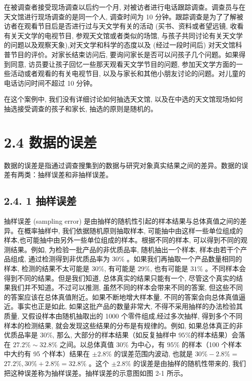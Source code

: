 \documentclass[10pt]{article}
\begin{document}
\begin{CJK*}{UTF8}{bsmi}
在被调查者接受现场调查以后约一个月, 对被访者进行电话跟踪调查。调查员与在天文馆进行现场调查的是同一个人, 调查时间为 10 分钟。跟踪调查是为了了解被访者在观看节目后是否进行过与天文学有关的活动 (买书、资料或者望远镜, 收看有关天文学的电视节目, 参观天文馆或者类似的场馆, 与孩子共同讨论有关天文学的问题以及观察天象),对天文学和科学的态度以及 (经过一段时间后) 对天文馆科普节目的评价。对家长结束访问后, 要询问家长是否可以问孩子几个问题。如果得到同意, 访员要让孩子回忆一些那天观看天文学节目的问题, 参加天文学方面的一些活动或者观看的有关电视节目, 以及与家长和其他小朋友讨论的问题。对儿童的电话访问时间不超过 10 分钟。

在这个案例中, 我们没有详细讨论如何抽选天文馆, 以及在中选的天文馆现场如何抽选接受调查的孩子和家长, 抽选的原则是随机的。

\section*{2.4 数据的误差}
数据的误差是指通过调查搜集到的数据与研究对象真实结果之间的差异。数据的误差有两类：抽样误差和非抽样误差。

\subsection*{2.4. 1 抽样误差}
抽样误差 (sampling error) 是由抽样的随机性引起的样本结果与总体真值之间的差异。在概率抽样中, 我们依据随机原则抽取样本, 可能抽中由这样一些单位组成的样本,也可能抽中由另外一些单位组成的样本。根据不同的样本, 可以得到不同的观测结果。例如, 为检验一批产品的非优质品率, 随机抽出一个样本, 样本由若干个产品组成, 通过检测得到非优质品率为 $30 \%$ 。如果我们再抽取一个产品数量相同的样本, 检测的结果不太可能是 $30 \%$, 有可能是 $29 \%$, 也有可能是 $31 \%$ 。不同样本会得到不同的结果。但是我们知道, 总体真实的结果只能有一个, 尽管这个真实的结果我们并不知道。不过可以推测, 虽然不同的样本会带来不同的答案, 但这些不同的答案应该在总体真值附近。如果不断地增大样本量, 不同的答案会向总体真值逼近。事实也正是如此, 如果这批产品的数量非常大, 不得不采用抽样的办法检验其质量, 又假设样本由随机抽取出的 1000 个零件组成,经过多次抽样, 得到多个不同样本的检测结果, 就会发现这些结果的分布是有规律的。例如, 如果总体真正的非优质品率是 $30 \%$, 那么, 大部分的样本结果（如反复抽样中 $95 \%$的样本结果）会落在 $27.2 \% \sim 32.8 \%$ 之间。以总体真值 $30 \%$ 为中心，有 $95 \%$ 的样本（100 个样本中大约有 95 个样本）结果在 $\pm 2.8 \%$ 的误差范围内波动, 也就是 $30 \%-2.8 \%=$ $27.2 \%, 30 \%+2.8 \%=32.8 \%$ 。这个 $\pm 2.8 \%$ 的误差是由抽样的随机性带来的, 我们把这种误差称为抽样误差。抽样误差的示意图如图 2-1 所示。


\end{CJK*}
\end{document}
